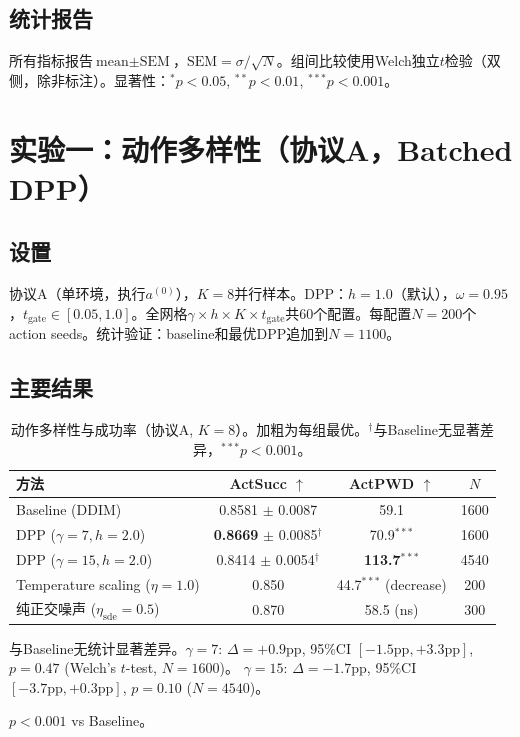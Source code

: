 \documentclass[11pt]{article}
\begin{document}
\subsection{统计报告}

所有指标报告$\text{mean} \pm \text{SEM}$，$\text{SEM} = \sigma/\sqrt{N}$。组间比较使用Welch独立$t$检验（双侧，除非标注）。显著性：$^{*}p<0.05$, $^{**}p<0.01$, $^{***}p<0.001$。

\section{实验一：动作多样性（协议A，Batched DPP）}

\subsection{设置}

协议A（单环境，执行$a^{(0)}$），$K=8$并行样本。DPP：$h=1.0$（默认），$\omega=0.95$，$t_{\text{gate}} \in [0.05, 1.0]$。全网格$\gamma \times h \times K \times t_{\text{gate}}$共60个配置。每配置$N=200$个action seeds。统计验证：baseline和最优DPP追加到$N=1100$。

\subsection{主要结果}

\begin{table}[t]
\centering
\caption{动作多样性与成功率（协议A, $K{=}8$）。加粗为每组最优。$^{\dagger}$与Baseline无显著差异，$^{***}p{<}0.001$。}
\label{tab:main}
\begin{tabular}{lccc}
\toprule
方法 & ActSucc $\uparrow$ & ActPWD $\uparrow$ & $N$ \\
\midrule
Baseline (DDIM) & 0.8581 $\pm$ 0.0087 & 59.1 & 1600 \\
DPP ($\gamma{=}7, h{=}2.0$) & \textbf{0.8669} $\pm$ 0.0085$^{\dagger}$ & 70.9$^{***}$ & 1600 \\
DPP ($\gamma{=}15, h{=}2.0$) & 0.8414 $\pm$ 0.0054$^{\dagger}$ & \textbf{113.7}$^{***}$ & 4540 \\
Temperature scaling ($\eta{=}1.0$) & 0.850 & 44.7$^{***}$ (decrease) & 200 \\
纯正交噪声 ($\eta_{\text{sde}}{=}0.5$) & 0.870 & 58.5 (ns) & 300 \\
\bottomrule
\end{tabular}
\vspace{-4pt}
\begin{tablenotes}
\item[$^{\dagger}$] 与Baseline无统计显著差异。$\gamma{=}7$: $\Delta{=}{+}0.9$pp, 95\%CI $[{-}1.5\text{pp},{+}3.3\text{pp}]$, $p{=}0.47$ (Welch's $t$-test, $N{=}1600$)。
$\gamma{=}15$: $\Delta{=}{-}1.7$pp, 95\%CI $[{-}3.7\text{pp},{+}0.3\text{pp}]$, $p{=}0.10$ ($N{=}4540$)。
\item[$^{***}$] $p < 0.001$ vs Baseline。
\end{tablenotes}
\end{table}
\end{document}
